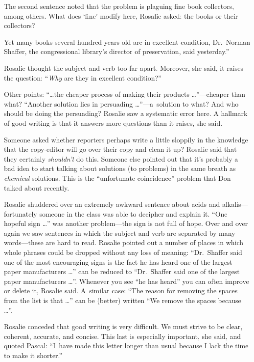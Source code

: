 The second
sentence noted that the problem is plaguing fine book collectors,
among others.  What does `fine' modify here, Rosalie asked: the books
or their collectors?  

{\narrower\smallskip\noindent
{}Yet many books several hundred years old are
in excellent condition, Dr.~Norman Shaffer, the congressional
library's director of preservation, said yesterday.''  
\smallskip}

Rosalie thought the subject and verb too far apart.
Moreover, she
said, it raises the question: ``{\it Why\/} are they in excellent
condition?'' 

Other points: ``\dots the cheaper process of making their
products \dots''---cheaper than what?  ``Another solution lies in
persuading \dots''---a~solution to what? And who should be doing the
persuading?  Rosalie saw a systematic error here. A hallmark of good
writing is that it answers more questions than it raises, she said.

Someone asked whether reporters perhaps write a little sloppily in the
knowledge that the copy-editor will go over their copy and clean it
up? Rosalie said that they certainly {\it shouldn't\/} do this. Someone
else pointed out that it's probably a bad idea to start talking about
solutions (to problems) in the same breath as {\it chemical\/}
solutions. This is the ``unfortunate coincidence'' problem that Don
talked about recently. 

Rosalie shuddered over an extremely awkward
sentence about acids and alkalis---fortunate\-ly someone in the class
was able to decipher and explain it.  ``One hopeful sign \dots'' was
another problem---the sign is not full of hope. Over and over again we
saw sentences in which the subject and verb are separated by many
words---these are hard to read. Rosalie pointed out a number of
places in which whole phrases could be dropped without any loss of
meaning: ``Dr.~Shaffer said one of the most encouraging signs is the
fact he has heard one of the largest paper manufacturers \dots'' can be
reduced to ``Dr.~Shaffer said one of the largest paper
manufacturers \dots''.  Whenever you see ``he has heard'' you can
often improve or delete it, Rosalie said. A~similar case: ``The
reason for removing the spaces from the list is that \dots'' can be
(better) written ``We remove the spaces because \dots''.

Rosalie conceded that good writing is very difficult. We must strive
to be clear, coherent, accurate, and concise. This last is especially
important, she said, and quoted Pascal: ``I~have made this letter
longer than usual because I lack the time to make it shorter.''

